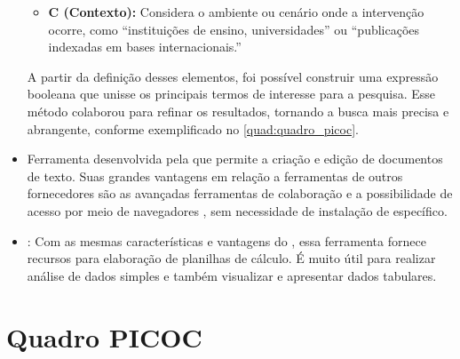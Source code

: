 \begin{itemize}
\begin{itemize}
    \item \textbf{C (Contexto):} Considera o ambiente ou cenário onde a intervenção ocorre, como “instituições de ensino, universidades” ou “publicações indexadas em bases internacionais.”
\end{itemize}
A partir da definição desses elementos, foi possível construir uma expressão booleana que unisse os principais termos de interesse para a pesquisa. Esse método colaborou para refinar os resultados, tornando a busca mais precisa e abrangente, conforme exemplificado no \autoref{quad:quadro_picoc}.
    \item \textbf{} Ferramenta desenvolvida pela  que permite a criação e edição de documentos de texto. Suas grandes vantagens em relação a ferramentas de outros fornecedores são as avançadas ferramentas de colaboração e a possibilidade de acesso por meio de navegadores , sem necessidade de instalação de  específico.
    \item \textbf{}: Com as mesmas características e vantagens do , essa ferramenta fornece recursos para elaboração de planilhas de cálculo. É muito útil para realizar análise de dados simples e também visualizar e apresentar dados tabulares.
\end{itemize}





\section{Quadro PICOC}
\label{section:quadro_picoc}

